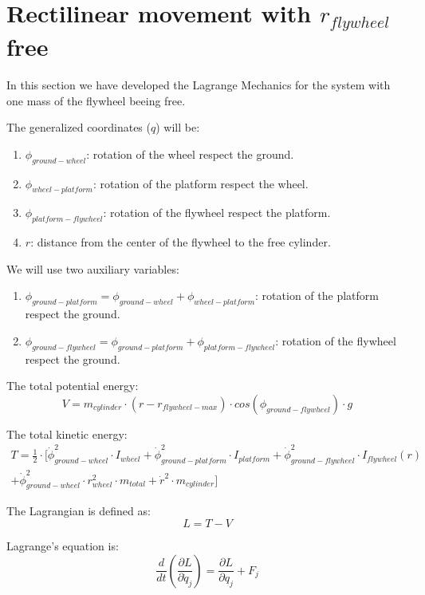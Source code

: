 \section{Rectilinear movement with $r_{flywheel}$ free}
In this section we have developed the Lagrange Mechanics for the system with
one mass of the flywheel beeing free.

The generalized coordinates ($q$) will be:
\begin{enumerate}
	\item $\phi_{ground-wheel}$: rotation of the wheel respect the ground.
	\item $\phi_{wheel-platform}$: rotation of the platform respect the wheel.
	\item $\phi_{platform-flywheel}$: rotation of the flywheel respect the platform.
	\item $r$: distance from the center of the flywheel to the free cylinder.

\end{enumerate}

We will use two auxiliary variables:
\begin{enumerate}
	\item $\phi_{ground-platform}=\phi_{ground-wheel}+\phi_{wheel-platform}$: rotation of the platform respect the ground.
	\item $\phi_{ground-flywheel}=\phi_{ground-platform}+\phi_{platform-flywheel}$: rotation of the flywheel respect the ground.
\end{enumerate}

The total potential energy:
\begin{equation}
	V = m_{cylinder}\cdot (r-r_{flywheel-max}) \cdot cos(\phi_{ground-flywheel}) \cdot g
\end{equation}


The total kinetic energy:
\begin{multline}
	T = \frac{1}{2}\cdot[\dot{\phi}_{ground-wheel}^2\cdot I_{wheel}
		+ \dot{\phi}_{ground-platform}^2 \cdot I_{platform}
		+ \dot{\phi}_{ground-flywheel}^2\cdot I_{flywheel}(r)\\
		+ \dot{\phi}_{ground-wheel}^2\cdot r_{wheel}^2\cdot m_{total}
		+ \dot{r}^2\cdot m_{cylinder}]
\end{multline}

The Lagrangian is defined as:
\begin{equation}
	L=T-V
\end{equation}

Lagrange's equation is:
\begin{equation}
	\frac{d}{dt}(\frac{\partial L}{\partial \dot{q}_j})=
	\frac{\partial L}{\partial q_j}	+ F_{j}
\end{equation}

